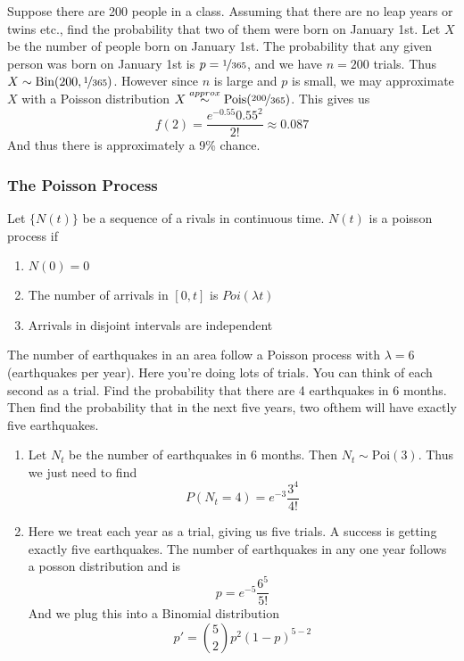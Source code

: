 \documentclass{report}
\begin{document}
\begin{example}
    Suppose there are 200 people in a class. Assuming that there are no leap years or twins etc., find the probability that two of them were born on January 1st.
    \solution
    Let $X$ be the number of people born on January 1st. The probability that any given person was born on January 1st is $p=\nicefrac 1 {365}$, and we have $n=200$ trials. Thus $X\sim\textup{Bin}(200, \nicefrac 1 {365})$. However since $n$ is large and $p$ is small, we may approximate $X$ with a Poisson distribution $X\overset{approx}{\sim}\textup{Pois}(\nicefrac{200}{365})$. This gives us
    \[
        f(2)=\frac{e^{-0.55 } 0.55^2}{2!}\approx 0.087
    \]
    And thus there is approximately a 9\% chance.
\end{example}

\subsubsection{The Poisson Process}
\todo
Let $\{N(t)\}$ be a sequence of a rivals in continuous time. $N(t)$ is a poisson process if 
\begin{enumerate}
    \item $N(0)=0$
    \item The number of arrivals in $[0,t]$ is $Poi(\lambda t)$
    \item Arrivals in disjoint intervals are independent
\end{enumerate}
\begin{example}[Earthquakes]
    The number of earthquakes in an area follow a Poisson process with $\lambda = 6$ (earthquakes per year). Here you're doing lots of trials. You can think of each second as a trial. Find the probability that there are 4 earthquakes in 6 months. Then find the probability that in the next five years, two ofthem will have exactly five earthquakes. 

    \begin{enumerate}
        \item Let $N_t$ be the number of earthquakes in 6 months. Then $N_t\sim \text{Poi}(3)$. Thus we just need to find
        \[
            P(N_t=4)=e^{-3}\frac {3^4}{4!}
        \]
        \item Here we treat each year as a trial, giving us five trials. A success is getting exactly five earthquakes. The number of earthquakes in any one year follows a posson distribution and is
        \[
            p=e^{-5}\frac {6^5}{5!}
        \]
        And we plug this into a Binomial distribution
        \[
            p'=\binom 5 2 p^2(1-p)^{5-2}
        \]
    \end{enumerate}   
\end{example}
\end{document}
